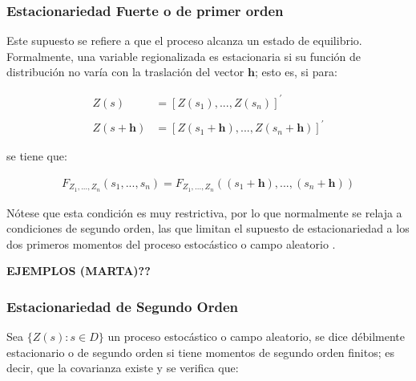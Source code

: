 \documentclass[
]{book}
\begin{document}
\hypertarget{estacionariedad-fuerte-o-de-primer-orden}{%
\subsubsection*{Estacionariedad Fuerte o de primer orden}\label{estacionariedad-fuerte-o-de-primer-orden}}

Este supuesto se refiere a que el proceso alcanza un estado de equilibrio. Formalmente, una variable regionalizada es estacionaria si su función de distribución no varía con la traslación del vector \(\textbf{h}\); esto es, si para:

\begin{align}
    Z(s)&=[Z(s_1),...,Z(s_n)]^{'} \\ \\
    Z(s+\textbf{h})&=[Z(s_{1} +\textbf{h}),...,Z(s_{n} + \textbf{h} )]^{'}
\end{align}

se tiene que:

\begin{align}
  F_{Z_1,...,Z_n}(s_1,...,s_n)=F_{Z_1,...,Z_n}((s_1+\textbf{h}),...,(s_n+\textbf{h}))  
\end{align}

Nótese que esta condición es muy restrictiva, por lo que normalmente se relaja a condiciones de segundo orden, las que limitan el supuesto de estacionariedad a los dos primeros momentos del proceso estocástico o campo aleatorio \citep{montero}.

\textbf{EJEMPLOS (MARTA)??}

\hypertarget{estacionariedad-de-segundo-orden}{%
\subsubsection*{Estacionariedad de Segundo Orden}\label{estacionariedad-de-segundo-orden}}

Sea \(\{Z(s): s\in D \}\) un proceso estocástico o campo aleatorio, se dice débilmente estacionario o de segundo orden si tiene momentos de segundo orden finitos; es decir, que la covarianza existe y se verifica que:
\end{document}
